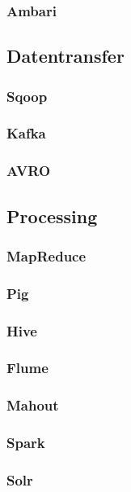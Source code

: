 \subsubsection*{Ambari}

\subsection{Datentransfer}
\subsubsection*{Sqoop}
\subsubsection*{Kafka}
\subsubsection*{AVRO}

\subsection{Processing}
\subsubsection*{MapReduce}
\subsubsection*{Pig}
\subsubsection*{Hive}
\subsubsection*{Flume}
\subsubsection*{Mahout}
\subsubsection*{Spark}
\subsubsection*{Solr}
